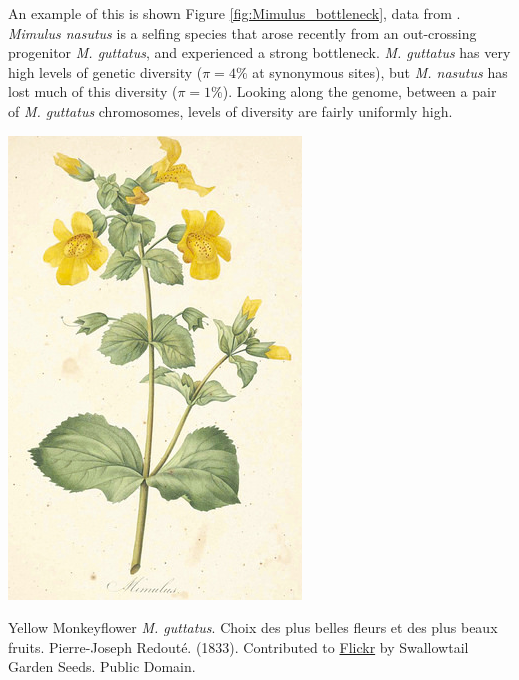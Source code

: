 An example of this is shown Figure
\ref{fig:Mimulus_bottleneck}, data from \citeauthor{brandvain:14}. {\it Mimulus nasutus} is a selfing
species that arose recently from an out-crossing progenitor {\it M.
  guttatus}, and experienced a strong bottleneck. {\it M. guttatus} has very high levels of genetic diversity
($\pi=4\%$ at synonymous sites), but {\it M. nasutus} has lost much
of this diversity ($\pi =1\%$). Looking along the genome, between a
pair of {\it M. guttatus} chromosomes, levels of
diversity are fairly uniformly high.
\begin{marginfigure}[2cm]
\begin{center}
  \includegraphics[width = 0.75 \textwidth]{illustration_images/Genetic_drift/Mimulus/Mimulus.png}
\end{center}
\caption{Yellow Monkeyflower {\it M. guttatus}. \newline \noindent \tiny{ Choix des plus belles fleurs et des plus beaux fruits. Pierre-Joseph
  Redout\'e. (1833). Contributed to \href{https://www.flickr.com/photos/swallowtailgardenseeds/14479197839/in/photolist-o4tF54-od9My9-odbSn4-r7eVtm-qrR4xf-x4XVdi-owo7PM-r5mart-roPqqi-owrprg-qsfzJv-wMDeSy-oupCu9-oeSX38-odaeHf-ovbTTS-roEdyK-tCQBqn-odwyWa-otAUPX-oePwpE-odca2V-tBxNdi-roL99F-odbN4q-ot1HNN-ouhP5r-odcvRH-oveh86-rpAnnD-roE9j9-rowiBc-osDEHS-od7QxD-oeQ9yS-odatza-ox9fq8-oujGWa-osBqTm-ovoAKj-r5qRxT-oeRVxu-oux9q2-tMvxm3-x5pLez-owuL1t-oePFVJ-ov1yHY-oeWskU-tmeZzB}{Flickr} by Swallowtail Garden Seeds. Public Domain.}} \label{fig:monkeyflower}  %
\end{marginfigure}

